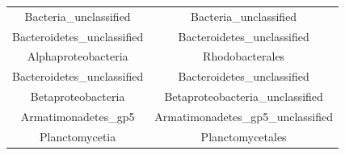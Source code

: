 \documentclass[]{article}
\begin{document}
\begin{longtable}[]{@{}cc@{}}
\begin{minipage}[t]{0.38\columnwidth}\centering\strut
Bacteria\_unclassified\strut
\end{minipage} & \begin{minipage}[t]{0.44\columnwidth}\centering\strut
Bacteria\_unclassified\strut
\end{minipage}\tabularnewline
\begin{minipage}[t]{0.38\columnwidth}\centering\strut
Bacteroidetes\_unclassified\strut
\end{minipage} & \begin{minipage}[t]{0.44\columnwidth}\centering\strut
Bacteroidetes\_unclassified\strut
\end{minipage}\tabularnewline
\begin{minipage}[t]{0.38\columnwidth}\centering\strut
Alphaproteobacteria\strut
\end{minipage} & \begin{minipage}[t]{0.44\columnwidth}\centering\strut
Rhodobacterales\strut
\end{minipage}\tabularnewline
\begin{minipage}[t]{0.38\columnwidth}\centering\strut
Bacteroidetes\_unclassified\strut
\end{minipage} & \begin{minipage}[t]{0.44\columnwidth}\centering\strut
Bacteroidetes\_unclassified\strut
\end{minipage}\tabularnewline
\begin{minipage}[t]{0.38\columnwidth}\centering\strut
Betaproteobacteria\strut
\end{minipage} & \begin{minipage}[t]{0.44\columnwidth}\centering\strut
Betaproteobacteria\_unclassified\strut
\end{minipage}\tabularnewline
\begin{minipage}[t]{0.38\columnwidth}\centering\strut
Armatimonadetes\_gp5\strut
\end{minipage} & \begin{minipage}[t]{0.44\columnwidth}\centering\strut
Armatimonadetes\_gp5\_unclassified\strut
\end{minipage}\tabularnewline
\begin{minipage}[t]{0.38\columnwidth}\centering\strut
Planctomycetia\strut
\end{minipage} & \begin{minipage}[t]{0.44\columnwidth}\centering\strut
Planctomycetales\strut
\end{minipage}\tabularnewline

\end{longtable}
\end{document}
